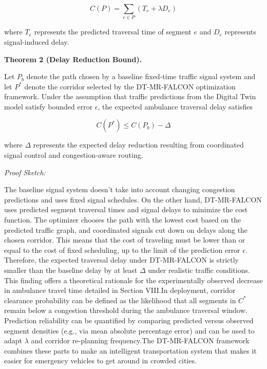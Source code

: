 \documentclass[conference]{IEEEtran}
\begin{document}
\begin{equation}
C(P) = \sum_{e \in P} (T_e + \lambda D_e)
\end{equation}

where $T_e$ represents the predicted traversal time of segment $e$ and $D_e$ represents signal-induced delay.

\textbf{Theorem 2 (Delay Reduction Bound).}

Let $P_b$ denote the path chosen by a baseline fixed-time traffic signal system and let $P^*$ denote the corridor selected by the DT-MR-FALCON optimization framework. Under the assumption that traffic predictions from the Digital Twin model satisfy bounded error $\epsilon$, the expected ambulance traversal delay satisfies

\begin{equation}
C(P^*) \le C(P_b) - \Delta
\end{equation}

where $\Delta$ represents the expected delay reduction resulting from coordinated signal control and congestion-aware routing.

\textit{Proof Sketch:}

The baseline signal system doesn't take into account changing congestion predictions and uses fixed signal schedules. On the other hand, DT-MR-FALCON uses predicted segment traversal times and signal delays to minimize the cost function. The optimizer chooses the path with the lowest cost based on the predicted traffic graph, and coordinated signals cut down on delays along the chosen corridor. This means that the cost of traveling must be lower than or equal to the cost of fixed scheduling, up to the limit of the prediction error $\epsilon$. Therefore, the expected traversal delay under DT-MR-FALCON is strictly smaller than the baseline delay by at least $\Delta$ under realistic traffic conditions.
This finding offers a theoretical rationale for the experimentally observed decrease in ambulance travel time detailed in Section VIII.In deployment, corridor clearance probability can be defined as the likelihood that all segments in $C^{*}$ remain below a congestion threshold during the ambulance traversal window. Prediction reliability can be quantified by comparing predicted versus observed segment densities (e.g., via mean absolute percentage error) and can be used to adapt $\lambda$ and corridor re-planning frequency.The DT-MR-FALCON framework combines these parts to make an intelligent transportation system that makes it easier for emergency vehicles to get around in crowded cities.
\end{document}
